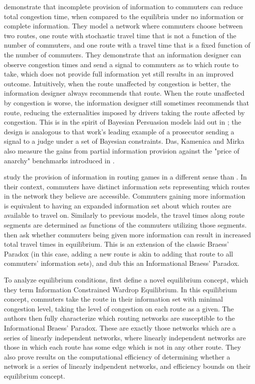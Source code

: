 \documentclass[JEL]{AEA}
\begin{document}
\cite{das-2017} demonstrate that incomplete provision of information to commuters can reduce total congestion time, when compared to the equilibria under no information or complete information. They model a network where commuters choose between two routes, one route with stochastic travel time that is not a function of the number of commuters, and one route with a travel time that is a fixed function of the number of commuters. They demonstrate that an information designer can observe congestion times and send a signal to commuters as to which route to take, which does not provide full information yet still results in an improved outcome. Intuitively, when the route unaffected by congestion is better, the information designer always recommends that route. When the route unaffected by congestion is worse, the information designer still sometimes recommends that route, reducing the externalities imposed by drivers taking the route affected by congestion. This is in the spirit of Bayesian Persuasion models laid out in \cite{kamenica-2011}; the design is analogous to that work's leading example of a prosecutor sending a signal to a judge under a set of Bayesian constraints. Das, Kamenica and Mirka also measure the gains from partial information provision against the "price of anarchy" benchmarks introduced in \cite{roughgarden-2002}.

\cite{acemoglu-2016} study the provision of information in routing games in a different sense than \cite{das-2017}. In their context, commuters have distinct information sets representing which routes in the network they believe are accessible. Commuters gaining more information is equivalent to having an expanded information set about which routes are available to travel on. Similarly to previous models, the travel times along route segments are determined as functions of the commuters utilizing those segments. \cite{acemoglu-2016} then ask whether commuters being given more information can result in increased total travel times in equilibrium. This is an extension of the classic Braess' Paradox (in this case, adding a new route is akin to adding that route to all commuters' information sets), and \cite{acemoglu-2016} dub this an Informational Braess' Paradox.

To analyze equilibrium conditions, \cite{acemoglu-2016} first define a novel equilibrium concept, which they term Information Constrained Wardrop Equilibrium. In this equilibrium concept, commuters take the route in their information set with minimal congestion level, taking the level of congestion on each route as a given. The authors then fully characterize which routing networks are susceptible to the Informational Braess' Paradox. These are exactly those networks which are a series of linearly independent networks, where linearly independent networks are those in which each route has some edge which is not in any other route. They also prove results on the computational efficiency of determining whether a network is a series of linearly indpendent networks, and efficiency bounds on their equilibrium concept.
\end{document}
